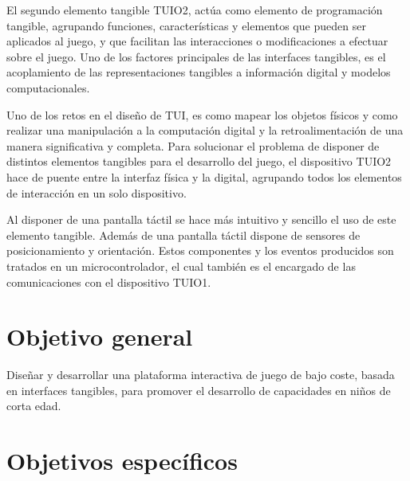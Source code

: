 El segundo elemento tangible TUIO2, actúa como elemento de programación tangible, agrupando funciones,
características y elementos que pueden ser aplicados al juego, y que facilitan las interacciones o
modificaciones a efectuar sobre el juego. Uno de los factores principales de las interfaces tangibles, es el acoplamiento de las representaciones tangibles a información digital y modelos computacionales. 

Uno de los retos en el diseño de TUI, es como mapear los objetos físicos y como realizar una manipulación a la computación digital y la retroalimentación de una manera significativa y completa.
Para solucionar el problema de disponer de distintos elementos tangibles para el desarrollo del juego, el dispositivo TUIO2 hace de puente entre la interfaz física y la digital, agrupando todos los elementos de interacción en un solo dispositivo. 

Al disponer de una pantalla táctil se hace más intuitivo y sencillo el uso de este elemento tangible. Además de una pantalla táctil dispone de sensores de posicionamiento y orientación. Estos componentes y los eventos producidos son tratados en un microcontrolador, el cual también es el encargado de las comunicaciones con el dispositivo TUIO1.



\section{Objetivo general}

Diseñar y desarrollar una plataforma interactiva de juego de bajo coste, basada en interfaces tangibles, para promover el desarrollo de capacidades en niños de corta edad.

\section{Objetivos específicos}

